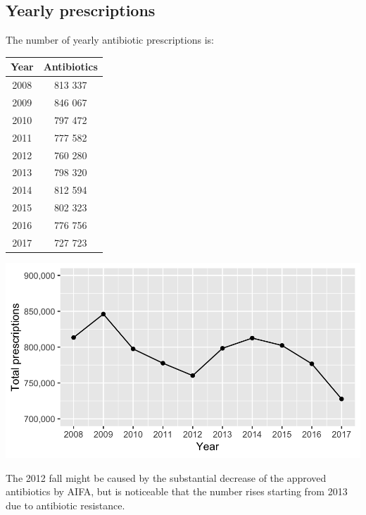 \subsection{Yearly prescriptions}
The number of yearly antibiotic prescriptions is:
\begin{table}[!htb]
	\centering
	\parbox{0.25\textwidth}{
		\begin{footnotesize}
			\begin{tabular}{c|c}
				Year & Antibiotics \\
				\hline
				2008 & 813 337 \\
				\hline
				2009 & 846 067 \\
				\hline
				2010 & 797 472 \\
				\hline
				2011 & 777 582 \\
				\hline
				2012 & 760 280 \\
				\hline
				2013 & 798 320 \\
				\hline
				2014 & 812 594 \\
				\hline
				2015 & 802 323 \\
				\hline
				2016 & 776 756 \\
				\hline
				2017 & 727 723 \\
			\end{tabular}
		\end{footnotesize}
	}
	\qquad
	\begin{minipage}[c]{0.6\textwidth}
		\centering
		\includegraphics[width=1\textwidth]{../plots/yearly_prescriptions.png}
	\end{minipage}
\end{table}

The 2012 fall might be caused by the substantial decrease of the approved antibiotics by AIFA\cite{calo}, but is noticeable that the number rises starting from 2013 due to antibiotic resistance. 

